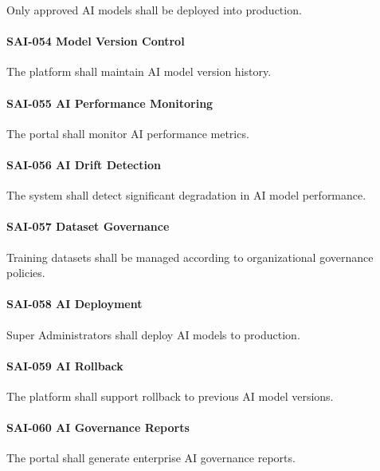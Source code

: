 Only approved AI models shall be deployed into production.

\paragraph{SAI-054 Model Version Control}

The platform shall maintain AI model version history.

\paragraph{SAI-055 AI Performance Monitoring}

The portal shall monitor AI performance metrics.

\paragraph{SAI-056 AI Drift Detection}

The system shall detect significant degradation in AI model
performance.

\paragraph{SAI-057 Dataset Governance}

Training datasets shall be managed according to organizational
governance policies.

\paragraph{SAI-058 AI Deployment}

Super Administrators shall deploy AI models to production.

\paragraph{SAI-059 AI Rollback}

The platform shall support rollback to previous AI model versions.

\paragraph{SAI-060 AI Governance Reports}

The portal shall generate enterprise AI governance reports.


